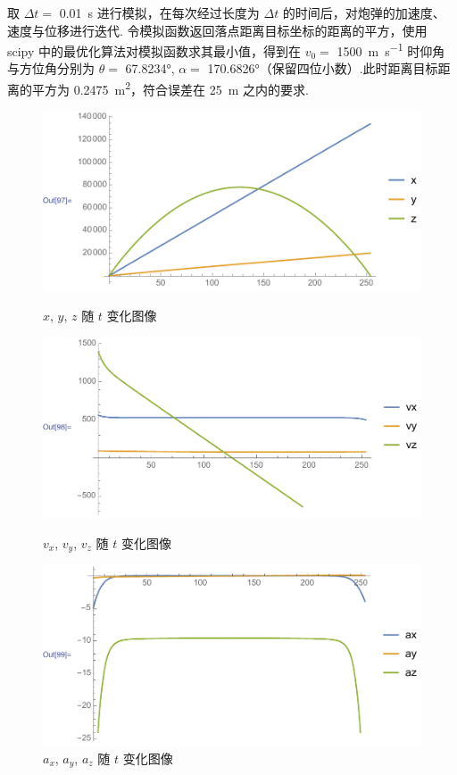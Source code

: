 \documentclass[UTF8]{ctexart}
\begin{document}
	取 $\Delta t = $ \SI{0.01}{s} 进行模拟，在每次经过长度为 $\Delta t$ 的时间后，对炮弹的加速度、速度与位移进行迭代. 令模拟函数返回落点距离目标坐标的距离的平方，使用 scipy 中的最优化算法对模拟函数求其最小值，得到在 $v_0 = $ \SI[per-mode=fraction,fraction-function=\sfrac]{1500}{\metre\per\second} 时仰角与方位角分别为 $\theta = $ \ang{67.8234}, $\alpha = $ \ang{170.6826}（保留四位小数）.此时距离目标距离的平方为 \SI{0.2475}{\meter\squared}，符合误差在 \SI{25}{m} 之内的要求.
	\begin{figure}[h]
		\centering
		\includegraphics[height=0.1\textheight]{xyz.pdf}
		\caption{$x$, $y$, $z$ 随 $t$ 变化图像}
		\includegraphics[height=0.1\textheight]{vxvyvz.pdf}
		\caption{$v_x$, $v_y$, $v_z$ 随 $t$ 变化图像}
		\includegraphics[height=0.1\textheight]{axayaz.pdf}
		\caption{$a_x$, $a_y$, $a_z$ 随 $t$ 变化图像}
	\end{figure}
	
\end{document}
